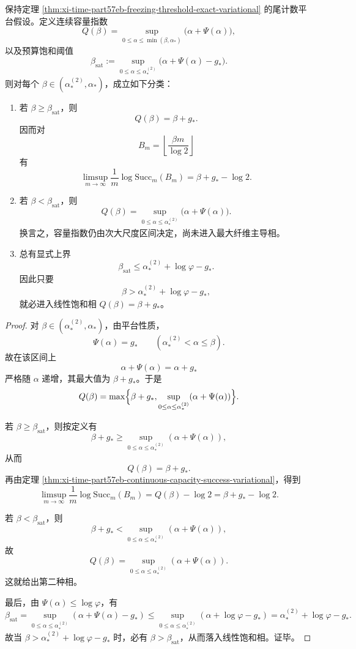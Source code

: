 \begin{theorem}\label{thm:xi-time-part57eb-oracle-escort-double-frontier}
保持定理 \ref{thm:xi-time-part57eb-freezing-threshold-exact-variational} 的尾计数平台假设。定义连续容量指数
\[
Q(\beta)=\sup_{0\le \alpha\le \min(\beta,\alpha_*)}\bigl(\alpha+\Psi(\alpha)\bigr),
\]
以及预算饱和阈值
\[
\beta_{\mathrm{sat}}
:=
\sup_{0\le \alpha\le \alpha_*^{(2)}}\bigl(\alpha+\Psi(\alpha)-g_*\bigr).
\]
则对每个 \(\beta\in(\alpha_*^{(2)},\alpha_*)\)，成立如下分类：
\begin{enumerate}
  \item 若 \(\beta\ge \beta_{\mathrm{sat}}\)，则
  \[
  \boxed{\;
  Q(\beta)=\beta+g_*.\;}
  \]
  因而对
  \[
  B_m=\left\lfloor \frac{\beta m}{\log 2}\right\rfloor
  \]
  有
  \[
  \limsup_{m\to\infty}\frac1m\log \mathrm{Succ}_m(B_m)
  =
  \beta+g_*-\log 2.
  \]
  \item 若 \(\beta<\beta_{\mathrm{sat}}\)，则
  \[
  \boxed{\;
  Q(\beta)=
  \sup_{0\le \alpha\le \alpha_*^{(2)}}\bigl(\alpha+\Psi(\alpha)\bigr).\;}
  \]
  换言之，容量指数仍由次大尺度区间决定，尚未进入最大纤维主导相。
  \item 总有显式上界
  \[
  \boxed{\;
  \beta_{\mathrm{sat}}
  \le
  \alpha_*^{(2)}+\log\varphi-g_*.\;}
  \]
  因此只要
  \[
  \beta>\alpha_*^{(2)}+\log\varphi-g_*,
  \]
  就必进入线性饱和相 \(Q(\beta)=\beta+g_*\)。
\end{enumerate}
\end{theorem}
\begin{proof}
对 \(\beta\in(\alpha_*^{(2)},\alpha_*)\)，由平台性质，
\[
\Psi(\alpha)=g_*
\qquad
(\alpha_*^{(2)}<\alpha\le \beta).
\]
故在该区间上
\[
\alpha+\Psi(\alpha)=\alpha+g_*
\]
严格随 \(\alpha\) 递增，其最大值为 \(\beta+g_*\)。于是
\[
Q(\beta)
=
\max\Bigl\{
\beta+g_*,
\sup_{0\le \alpha\le \alpha_*^{(2)}}(\alpha+\Psi(\alpha))
\Bigr\}.
\]

若 \(\beta\ge \beta_{\mathrm{sat}}\)，则按定义有
\[
\beta+g_*
\ge
\sup_{0\le \alpha\le \alpha_*^{(2)}}(\alpha+\Psi(\alpha)),
\]
从而
\[
Q(\beta)=\beta+g_*.
\]
再由定理 \ref{thm:xi-time-part57eb-continuous-capacity-success-variational}，得到
\[
\limsup_{m\to\infty}\frac1m\log \mathrm{Succ}_m(B_m)
=
Q(\beta)-\log 2
=
\beta+g_*-\log 2.
\]

若 \(\beta<\beta_{\mathrm{sat}}\)，则
\[
\beta+g_*
<
\sup_{0\le \alpha\le \alpha_*^{(2)}}(\alpha+\Psi(\alpha)),
\]
故
\[
Q(\beta)=
\sup_{0\le \alpha\le \alpha_*^{(2)}}(\alpha+\Psi(\alpha)).
\]
这就给出第二种相。

最后，由 \(\Psi(\alpha)\le \log\varphi\)，有
\[
\beta_{\mathrm{sat}}
=
\sup_{0\le \alpha\le \alpha_*^{(2)}}(\alpha+\Psi(\alpha)-g_*)
\le
\sup_{0\le \alpha\le \alpha_*^{(2)}}(\alpha+\log\varphi-g_*)
=
\alpha_*^{(2)}+\log\varphi-g_*.
\]
故当
\(
\beta>\alpha_*^{(2)}+\log\varphi-g_*
\)
时，必有 \(\beta>\beta_{\mathrm{sat}}\)，从而落入线性饱和相。证毕。
\end{proof}



\endinput
